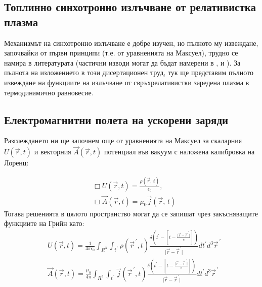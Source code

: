 \appendixpage
\begin{appendices}
	\lfoot{}
	\section{Топлинно синхотронно излъчване от релативистка плазма}
	
	Механизмът на синхотронно излъчване е добре изучен, но пълното му извеждане, започвайки от първи принципи (т.е. от уравненията на Максуел), трудно се намира в литературата (частични изводи могат да бъдат намерени в \cite{Schwigner1949}, \cite{Westfold1959} и \cite{WESTFOLD_II}). За пълнота на изложението в този дисертационен труд, тук ще представим пълното извеждане на функциите на излъчване от свръхрелативистки заредена плазма в термодинамично равновесие.
	
	\subsection{Електромагнитни полета на ускорени заряди}
	
	Разглеждането ни ще започнем още от уравненията на Максуел за скаларния $U\left(\vec{r},t\right)$ и векторния $\vec{A}\left(\vec{r},t\right)$ потенциал във вакуум с наложена калибровка на Лоренц:
	
	\begin{equation}
		\begin{split}
		&\Box U\left(\vec{r},t\right) = \frac{\rho(\vec{r},\,t)}{\epsilon_0},\\
	    &\Box \vec{A}\left(\vec{r},t\right) = \mu_0\vec{j}(\vec{r},\,t)
		\end{split}
	\end{equation}
	Тогава решенията в цялото пространство могат да се запишат чрез закъсняващите функциите на Грийн като:
	\begin{equation}
		\begin{split}
			&U\left(\vec{r},t\right) = \frac{1}{4\pi\epsilon_0}\int_{R^3}\int_{t^{\,\prime}} \rho(\vec{r}^{\,\prime},t)\frac{\delta\left(t^\prime - \left[t - \frac{\vert \vec{r} - \vec{r}^{\,\prime}\vert}{c}\right]\right)}{\vert \vec{r} - \vec{r}^{\,\prime}\vert}dt^\prime d^3\vec{r}^{\,\prime}\\
			&\vec{A}\left(\vec{r},t\right) = \frac{\mu_0}{4\pi}\int_{R^3}\int_{t^{\,\prime}} \vec{j}(\vec{r}^{\,\prime},t)\frac{\delta\left(t^\prime - \left[t - \frac{\vert \vec{r} - \vec{r}^{\,\prime}\vert}{c}\right]\right)}{\vert \vec{r} - \vec{r}^{\,\prime}\vert}dt^\prime		d^3\vec{r}^{\,\prime} 
		\end{split}
	\end{equation} 
	

\end{appendices}
